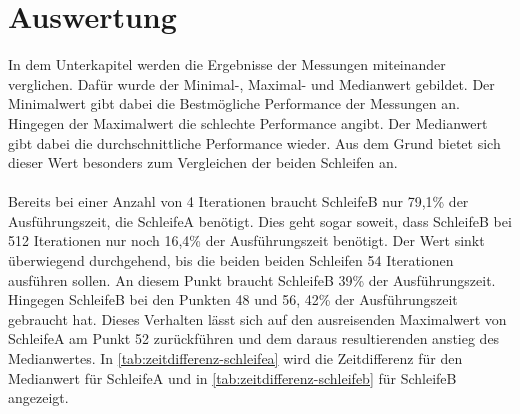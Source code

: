     \section{Auswertung}
    In dem Unterkapitel werden die Ergebnisse der Messungen miteinander verglichen.
    Dafür wurde der Minimal-, Maximal- und Medianwert gebildet.
    Der Minimalwert gibt dabei die Bestmögliche Performance der Messungen an.
    Hingegen der Maximalwert die schlechte Performance angibt.
    Der Medianwert gibt dabei die durchschnittliche Performance wieder.
    Aus dem Grund bietet sich dieser Wert besonders zum Vergleichen der beiden Schleifen an.\\
    \\
    Bereits bei einer Anzahl von 4 Iterationen braucht SchleifeB nur 79,1\% der Ausführungszeit, die SchleifeA benötigt.
    Dies geht sogar soweit, dass SchleifeB bei 512 Iterationen nur noch 16,4\% der Ausführungszeit benötigt.
    Der Wert sinkt überwiegend durchgehend, bis die beiden beiden Schleifen 54 Iterationen ausführen sollen.
    An diesem Punkt braucht SchleifeB 39\% der Ausführungszeit.
    Hingegen SchleifeB bei den Punkten 48 und 56, 42\% der Ausführungszeit gebraucht hat.
    Dieses Verhalten lässt sich auf den ausreisenden Maximalwert von SchleifeA am Punkt 52 zurückführen und dem daraus resultierenden anstieg des Medianwertes.
    In \cref{tab:zeitdifferenz-schleifea} wird die Zeitdifferenz für den Medianwert für SchleifeA und in \cref{tab:zeitdifferenz-schleifeb} für SchleifeB angezeigt.
    
